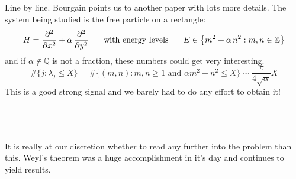 \documentclass[12pt]{article}
\begin{document}
\newpage

\noindent Line by line.  Bourgain points us to another paper with lots more details.  The system being studied is the free particle on a rectangle:
$$ H = \frac{\partial^2}{\partial x^2} + \alpha \, \frac{\partial^2}{\partial y^2} 
\hspace{0.25in}\text{with energy levels}\hspace{0.25in}
E \in \big\{ m^2 + \alpha \, n^2 : m,n \in \mathbb{Z} \big\} $$
and if $\alpha \notin \mathbb{Q}$ is not a fraction, these numbers could get very interesting. 
$$ \# \{ j : \lambda_j \leq X \} = \# \big\{ (m,n): m,n \geq 1 \text{ and } \alpha m^2 + n^2 \leq X \big\} \sim \frac{\pi}{4 \sqrt{\alpha} }X $$
This is a good strong signal and we barely had to do any effort to obtain it! \\ \\
 \\ \\
It is really at our discretion whether to read any further into the problem than this.  Weyl's theorem was a huge accomplishment in it's day and continues to yield results. \\ \\
\end{document}
